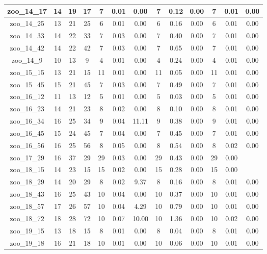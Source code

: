 \begin{landscape}
\begin{longtable}{|c|c|c|c|c|c|c|c|c|c|c|c|c|}
zoo\_14\_17 & 14 & 19 & 17 & 7 & 0.01 & 0.00 & 7 & 0.12 & 0.00 & 7 & 0.01 & 0.00 \\ \hline 
zoo\_14\_25 & 13 & 21 & 25 & 6 & 0.01 & 0.00 & 6 & 0.16 & 0.00 & 6 & 0.01 & 0.00 \\ \hline 
zoo\_14\_33 & 14 & 22 & 33 & 7 & 0.03 & 0.00 & 7 & 0.40 & 0.00 & 7 & 0.01 & 0.00 \\ \hline 
zoo\_14\_42 & 14 & 22 & 42 & 7 & 0.03 & 0.00 & 7 & 0.65 & 0.00 & 7 & 0.01 & 0.00 \\ \hline 
zoo\_14\_9 & 10 & 13 & 9 & 4 & 0.01 & 0.00 & 4 & 0.24 & 0.00 & 4 & 0.01 & 0.00 \\ \hline 
zoo\_15\_15 & 13 & 21 & 15 & 11 & 0.01 & 0.00 & 11 & 0.05 & 0.00 & 11 & 0.01 & 0.00 \\ \hline 
zoo\_15\_45 & 15 & 21 & 45 & 7 & 0.03 & 0.00 & 7 & 0.49 & 0.00 & 7 & 0.01 & 0.00 \\ \hline 
zoo\_16\_12 & 11 & 13 & 12 & 5 & 0.01 & 0.00 & 5 & 0.03 & 0.00 & 5 & 0.01 & 0.00 \\ \hline 
zoo\_16\_23 & 14 & 21 & 23 & 8 & 0.02 & 0.00 & 8 & 0.10 & 0.00 & 8 & 0.01 & 0.00 \\ \hline 
zoo\_16\_34 & 16 & 25 & 34 & 9 & 0.04 & 11.11 & 9 & 0.38 & 0.00 & 9 & 0.01 & 0.00 \\ \hline 
zoo\_16\_45 & 15 & 24 & 45 & 7 & 0.04 & 0.00 & 7 & 0.45 & 0.00 & 7 & 0.01 & 0.00 \\ \hline 
zoo\_16\_56 & 16 & 25 & 56 & 8 & 0.05 & 0.00 & 8 & 0.54 & 0.00 & 8 & 0.02 & 0.00 \\ \hline 
zoo\_17\_29 & 16 & 37 & 29 & 29 & 0.03 & 0.00 & 29 & 0.43 & 0.00 & 29 & 0.00 &  \\ \hline 
zoo\_18\_15 & 14 & 23 & 15 & 15 & 0.02 & 0.00 & 15 & 0.28 & 0.00 & 15 & 0.00 &  \\ \hline 
zoo\_18\_29 & 14 & 20 & 29 & 8 & 0.02 & 9.37 & 8 & 0.16 & 0.00 & 8 & 0.01 & 0.00 \\ \hline 
zoo\_18\_43 & 16 & 25 & 43 & 10 & 0.04 & 0.00 & 10 & 0.37 & 0.00 & 10 & 0.01 & 0.00 \\ \hline 
zoo\_18\_57 & 17 & 26 & 57 & 10 & 0.04 & 4.29 & 10 & 0.79 & 0.00 & 10 & 0.01 & 0.00 \\ \hline 
zoo\_18\_72 & 18 & 28 & 72 & 10 & 0.07 & 10.00 & 10 & 1.36 & 0.00 & 10 & 0.02 & 0.00 \\ \hline 
zoo\_19\_15 & 13 & 18 & 15 & 8 & 0.01 & 0.00 & 8 & 0.04 & 0.00 & 8 & 0.01 & 0.00 \\ \hline 
zoo\_19\_18 & 16 & 21 & 18 & 10 & 0.01 & 0.00 & 10 & 0.06 & 0.00 & 10 & 0.01 & 0.00 \\ \hline 

\end{longtable}
\end{landscape}
